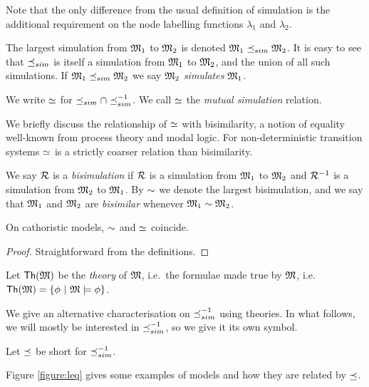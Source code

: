 \NI Note that the only difference from the usual definition of
simulation is the additional requirement on the node labelling
functions $\lambda_1$ and $\lambda_2$.

\begin{definition}
The largest simulation from $\frak{M}_1$ to $\frak{M}_2$ is denoted $\frak{M}_1
\preceq_{sim} \frak{M}_2$.  It is easy to see that $\preceq_{sim}$ is itself a
simulation from $\frak{M}_1$ to $\frak{M}_2$, and the union of all such
simulations.  If $\frak{M}_1 \preceq_{sim} \frak{M}_2$ we say $\frak{M}_2$
\emph{simulates} $\frak{M}_1$.

We write $\simeq$ for $\preceq_{sim} \cap \preceq_{sim}^{-1}$. We call $\simeq$ the
\emph{mutual simulation} relation.
\end{definition}

\NI We briefly discuss the relationship of $\simeq$ with
bisimilarity, a notion of equality well-known from process theory and
modal logic. For non-deterministic transition systems $\simeq$ is a
strictly coarser relation than bisimilarity.

\begin{definition}
We say $\mathcal{R}$ is a \emph{bisimulation} if $\mathcal{R}$ is a simulation from
$\frak{M}_1$ to $\frak{M}_2$ and $\mathcal{R}^{-1}$ is a simulation from $\frak{M}_2$ to
$\frak{M}_1$. By $\sim$ we denote the largest bisimulation, and we say
that $\frak{M}_1$ and $\frak{M}_2$ are \emph{bisimilar} whenever $\frak{M}_1
\sim \frak{M}_2$.
\end{definition}

\begin{lemma}
On cathoristic models, $\sim$ and $\simeq$ coincide.
\end{lemma}
\begin{proof}
Straightforward from the definitions.
\end{proof}

\begin{definition}
Let $\mathsf{Th}(\frak{M})$ be the \emph{theory} of $\frak{M}$, i.e.~the formulae
made true by $\frak{M}$, i.e.~$\mathsf{Th}(\frak{M}) = \{\phi\ |\ \frak{M} \models
\phi \}$.
\end{definition}

\NI We give an alternative characterisation on $\preceq_{sim}^{-1}$ using
theories. In what follows, we will mostly be interested in
$\preceq_{sim}^{-1}$, so we give it its own symbol.

\begin{definition}
Let $\preceq$  be short for $\preceq_{sim}^{-1}$. 
\end{definition}

\NI Figure \ref{figure:leq} gives some examples of models and how they
are related by $\preceq$.

